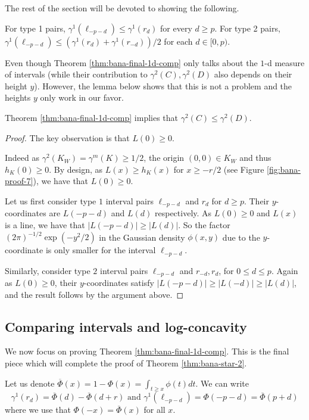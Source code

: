 The rest of the section will be devoted to showing the following. 
\begin{theorem}
\label{thm:bana-final-1d-comp}
   For type 1 pairs, $\gamma^1(\ell_{-p-d}) \leq \gamma^1 (r_{d})$ for every $d\geq p$. 
    For type 2 pairs,  $\gamma^1(\ell_{-p-d}) \leq (\gamma^1 (r_{d})+ \gamma^1(r_{-d}))/2$ for each $d\in [0,p)$.
\end{theorem}
Even though Theorem \ref{thm:bana-final-1d-comp} only talks about the $1$-d measure of intervals (while their contribution to $\gamma^2(C), \gamma^2(D)$ also depends on their height $y$). However, the lemma below shows that this is not a problem and the heights $y$ only work in our favor.
\begin{lemma}
        Theorem \ref{thm:bana-final-1d-comp} implies that $\gamma^2(C) \leq \gamma^2(D)$.%
\end{lemma}
\begin{proof}
The key observation is that $L(0)\geq 0$. 

Indeed as $\gamma^2(K_W) = \gamma^m(K) \geq 1/2$, the  origin $(0,0) \in K_W$ and thus $h_K(0)\geq 0$. By design, as $L(x) \geq h_K(x)$ for $x \geq -r/2$ (see Figure \ref{fig:bana-proof-7}), we have that $L(0)\geq 0$.

Let us first consider type $1$ interval pairs $\ell_{-p-d}$ and $r_{d}$ for $d\geq p$. Their $y$-coordinates are $L(-p-d)$ and $L(d)$ respectively. As $L(0) \geq 0$ and $L(x)$ is a line, we have that $|L(-p-d)| \geq |L(d)|$. So the factor $(2\pi)^{-1/2} \exp(-y^2/2)$ in the Gaussian density $\phi(x,y)$ due to the $y$-coordinate is only smaller for the interval $\ell_{-p-d}$.

Similarly, consider type $2$ interval pairs $\ell_{-p-d}$ and $r_{-d}, r_d$, for $0 \leq d \leq p$. Again as $L(0)\geq 0$, their $y$-coordinates satisfy $|L(-p-d)| \geq |L(-d)|\geq |L(d)|$, and the result follows by the argument above.
\end{proof}

\subsection{Comparing intervals and log-concavity}
We now focus on proving Theorem \ref{thm:bana-final-1d-comp}. This is the final piece which will complete the proof of Theorem \ref{thm:bana-star-2}.

Let us denote $\overline{\Phi}(x) = 1-\Phi(x) = \int_{t\geq x} \phi(t) dt$. We can write \[\gamma^1(r_d)= \overline{\Phi}(d)-\overline{\Phi}(d+r) 
\text{ and } \gamma^1(\ell_{-p-d}) =\Phi(-p-d) = \overline{\Phi}(p+d)\]
where we use that $\Phi(-x)= \overline{\Phi}(x)$ for all $x$.

